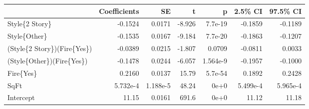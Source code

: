 \begin{tabular}{lrrrrrr}
\toprule
{} &  Coefficients &       SE &      t &        p &  2.5\% CI &  97.5\% CI \\
\midrule
Style\{2 Story\}              &       -0.1524 &   0.0171 & -8.926 &  7.7e-19 &  -0.1859 &   -0.1189 \\
Style\{Other\}                &       -0.1535 &   0.0167 & -9.184 &  7.7e-20 &  -0.1863 &   -0.1207 \\
(Style\{2 Story\})(Fire\{Yes\}) &       -0.0389 &   0.0215 & -1.807 &   0.0709 &  -0.0811 &    0.0033 \\
(Style\{Other\})(Fire\{Yes\})   &       -0.1478 &   0.0244 & -6.057 & 1.564e-9 &  -0.1957 &   -0.1000 \\
Fire\{Yes\}                   &        0.2160 &   0.0137 &  15.79 &  5.7e-54 &   0.1892 &    0.2428 \\
SqFt                        &      5.732e-4 & 1.188e-5 &  48.24 &     0e+0 & 5.499e-4 &  5.965e-4 \\
Intercept                   &         11.15 &   0.0161 &  691.6 &     0e+0 &    11.12 &     11.18 \\
\bottomrule
\end{tabular}
